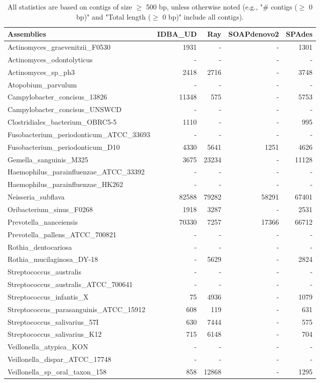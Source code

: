 \documentclass[12pt,a4paper]{article}
\begin{document}
\begin{table}[ht]
\begin{center}
\caption{All statistics are based on contigs of size $\geq$ 500 bp, unless otherwise noted (e.g., "\# contigs ($\geq$ 0 bp)" and "Total length ($\geq$ 0 bp)" include all contigs).}
\begin{tabular}{|l*{4}{|r}|}
\hline
Assemblies & IDBA\_UD & Ray & SOAPdenovo2 & SPAdes \\ \hline
Actinomyces\_graevenitzii\_F0530 & 1931 & - & - & 1301 \\ \hline
Actinomyces\_odontolyticus & - & - & - & - \\ \hline
Actinomyces\_sp\_ph3 & 2418 & 2716 & - & 3748 \\ \hline
Atopobium\_parvulum & - & - & - & - \\ \hline
Campylobacter\_concisus\_13826 & 11348 & 575 & - & 5753 \\ \hline
Campylobacter\_concisus\_UNSWCD & - & - & - & - \\ \hline
Clostridiales\_bacterium\_OBRC5-5 & 1110 & - & - & 995 \\ \hline
Fusobacterium\_periodonticum\_ATCC\_33693 & - & - & - & - \\ \hline
Fusobacterium\_periodonticum\_D10 & 4330 & 5641 & 1251 & 4626 \\ \hline
Gemella\_sanguinis\_M325 & 3675 & 23234 & - & 11128 \\ \hline
Haemophilus\_parainfluenzae\_ATCC\_33392 & - & - & - & - \\ \hline
Haemophilus\_parainfluenzae\_HK262 & - & - & - & - \\ \hline
Neisseria\_subflava & 82588 & 79282 & 58291 & 67401 \\ \hline
Oribacterium\_sinus\_F0268 & 1918 & 3287 & - & 2531 \\ \hline
Prevotella\_nanceiensis & 70330 & 7257 & 17366 & 66712 \\ \hline
Prevotella\_pallens\_ATCC\_700821 & - & - & - & - \\ \hline
Rothia\_dentocariosa & - & - & - & - \\ \hline
Rothia\_mucilaginosa\_DY-18 & - & 5629 & - & 2824 \\ \hline
Streptococcus\_australis & - & - & - & - \\ \hline
Streptococcus\_australis\_ATCC\_700641 & - & - & - & - \\ \hline
Streptococcus\_infantis\_X & 75 & 4936 & - & 1079 \\ \hline
Streptococcus\_parasanguinis\_ATCC\_15912 & 608 & 119 & - & 631 \\ \hline
Streptococcus\_salivarius\_57I & 630 & 7444 & - & 575 \\ \hline
Streptococcus\_salivarius\_K12 & 715 & 6148 & - & 704 \\ \hline
Veillonella\_atypica\_KON & - & - & - & - \\ \hline
Veillonella\_dispar\_ATCC\_17748 & - & - & - & - \\ \hline
Veillonella\_sp\_oral\_taxon\_158 & 858 & 12868 & - & 1295 \\ \hline
\end{tabular}
\end{center}
\end{table}
\end{document}
